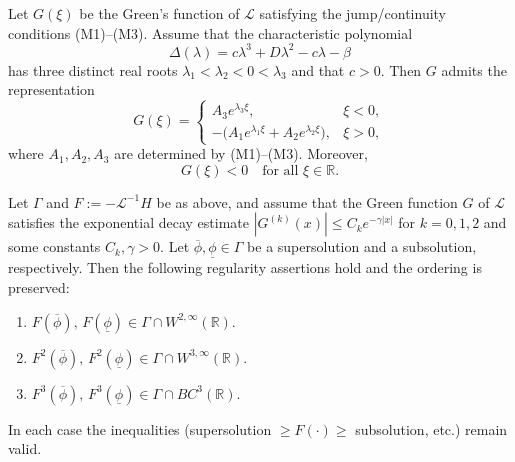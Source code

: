 \documentclass[10pt,a4paper]{amsart}
\begin{document}
  \begin{lemma}\label{Green}
  	Let $G(\xi)$ be the Green's function of $\mathcal L$ satisfying the jump/continuity
  	conditions \textup{(M1)--(M3)}.
  	Assume that the characteristic polynomial
  	\[
  	\Delta(\lambda)=c\lambda^3 + D\lambda^2 - c\lambda - \beta
  	\]
  	has three distinct real roots $\lambda_1<\lambda_2<0<\lambda_3$ and that $c>0$.
  	Then $G$ admits the representation
  	\[
  	G(\xi)=
  	\begin{cases}
  		A_3 e^{\lambda_3\xi}, & \xi<0,\\[4pt]
  		- \bigl(A_1 e^{\lambda_1\xi}+A_2 e^{\lambda_2\xi}\bigr), & \xi>0,
  	\end{cases}
  	\]
  	where $A_1,A_2,A_3$ are determined by (M1)--(M3). Moreover,
  	\[
  	G(\xi)<0 \quad \text{for all }\xi\in\mathbb{R}.
  	\]
  \end{lemma}

 \begin{theorem}\label{smooth1}
 	Let $\Gamma$ and $F:=-\mathcal L^{-1}H$ be as above, and assume that the Green
 	function $G$ of $\mathcal L$ satisfies the exponential decay estimate
 	$|G^{(k)}(x)|\le C_k e^{-\gamma|x|}$ for $k=0,1,2$ and some constants $C_k,\gamma>0$.
 	Let $\overline\phi,\underline\phi\in\Gamma$ be a supersolution and a subsolution,
 	respectively. Then the following regularity assertions hold and the ordering is preserved:
 	\begin{enumerate}
 		\item $F(\overline\phi),\,F(\underline\phi)\in \Gamma\cap W^{2,\infty}(\mathbb R)$.
 		\item $F^2(\overline\phi),\,F^2(\underline\phi)\in \Gamma\cap W^{3,\infty}(\mathbb R)$.
 		\item $F^3(\overline\phi),\,F^3(\underline\phi)\in \Gamma\cap BC^3(\mathbb R)$.
 	\end{enumerate}
 	In each case the inequalities (supersolution $\ge F(\cdot)\ge$ subsolution, etc.)
 	remain valid.
 \end{theorem}
\end{document}
